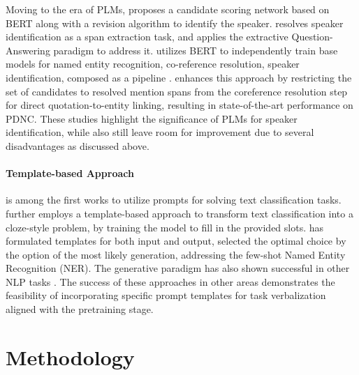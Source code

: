 \documentclass[letterpaper]{article} %
\begin{document}
Moving to the era of PLMs, \citet{DBLP:conf/interspeech/ChenLL21} proposes a candidate scoring network based on BERT along with a revision algorithm to identify the speaker. \citet{yu-etal-2022-end} resolves speaker identification as a span extraction task, and applies the extractive Question-Answering paradigm to address it.
\citet{DBLP:conf/lrec/BammanLM20} utilizes BERT to independently train base models for named entity recognition, co-reference resolution, speaker identification, composed as a pipeline \cite{xu-choi-2020-revealing}.
\citet{DBLP:conf/lrec/VishnubhotlaHH22} enhances this approach by restricting the set of candidates to resolved mention spans from the coreference resolution step for direct quotation-to-entity linking, resulting in state-of-the-art performance on PDNC. These studies highlight the significance of PLMs for speaker identification, while also still leave room for improvement due to several disadvantages as discussed above.


\paragraph{Template-based Approach}
\citet{DBLP:conf/nips/BrownMRSKDNSSAA20} is among the first works to utilize prompts for solving text classification tasks. \citet{DBLP:journals/corr/abs-2001-07676} further employs a template-based approach to transform text classification into a cloze-style problem, by training the model to fill in the provided slots. \citet{DBLP:conf/acl/CuiWLYZ21} has formulated templates for both input and output, selected the optimal choice by the option of the most likely generation, addressing the few-shot Named Entity Recognition (NER). The generative paradigm has also shown successful in other NLP tasks \cite{7475902,lu-etal-2021-text2event}. The success of these approaches in other areas demonstrates the feasibility of incorporating specific prompt templates for task verbalization aligned with the pretraining stage.



\section{Methodology}
\label{sec:approach}
\end{document}
